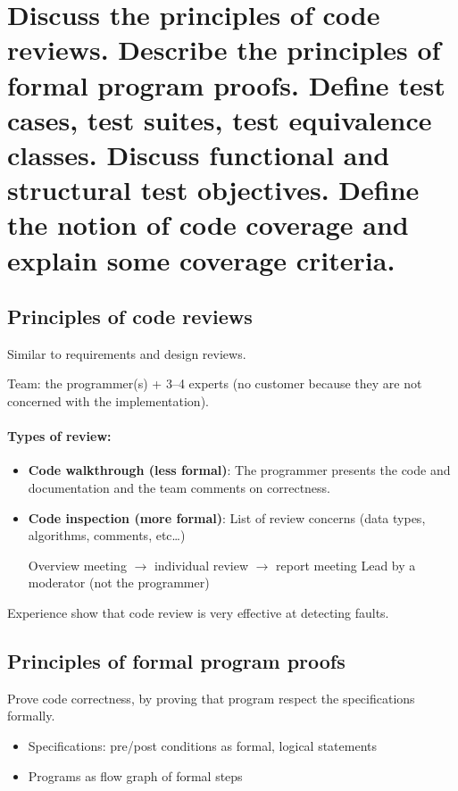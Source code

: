\clearpage{}
\section{Discuss the principles of code reviews. Describe the principles of
formal program proofs. Define test cases, test suites, test equivalence
classes. Discuss functional and structural test objectives. Define the
notion of code coverage and explain some coverage criteria.}


\subsection{Principles of code reviews}

Similar to requirements and design reviews.

Team: the programmer(s) + 3--4 experts (no customer because they are not
concerned with the implementation).

\paragraph{Types of review:}
\begin{itemize}
    \item \textbf{Code walkthrough (less formal)}:
        The programmer presents the code and documentation and the team comments on
        correctness.

    \item \textbf{Code inspection (more formal)}:
        List of review concerns (data types, algorithms, comments, etc\ldots)

        Overview meeting $\rightarrow$ individual review $\rightarrow$ report meeting
        Lead by a moderator (not the programmer) 
\end{itemize}

Experience show that code review is very effective at detecting faults.


\subsection{Principles of formal program proofs}

Prove code correctness, by proving that program respect the specifications formally.
\begin{itemize}
	\item Specifications: pre/post conditions as formal, logical statements
	\item Programs as flow graph of formal steps
\end{itemize}
